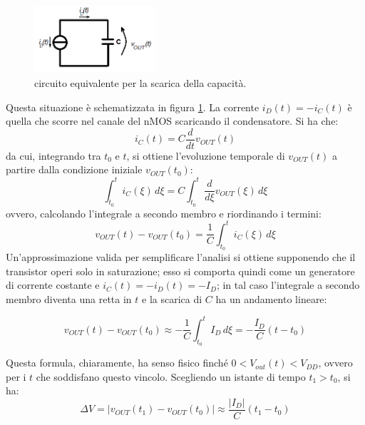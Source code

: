 \begin{figure}[hbt!]
	\centering
	\includegraphics[width=0.4\textwidth]{figure/Sch_scaricaC.png}
	\caption{circuito equivalente per la scarica della capacità.}
	\label{fig:fig_sch_scaricaC}
\end{figure}

Questa situazione è schematizzata in figura \ref{fig:fig_sch_scaricaC}. La corrente $i_D(t) = - i_C(t)$ è quella che scorre nel canale del nMOS scaricando il condensatore. Si ha che:
\begin{equation}
i_C(t) = C \frac{d}{dt}v_{OUT}(t)
\label{eq:eq_condensatore}
\end{equation}
da cui, integrando tra $t_0$ e $t$, si ottiene l'evoluzione temporale di $v_{OUT}(t)$ a partire dalla condizione iniziale $v_{OUT}(t_0)$:
\begin{equation}
\int_{t_0}^{t} i_C(\xi)\, d\xi = C \int_{t_0}^{t} \frac{d}{d\xi}v_{OUT}(\xi)\, d\xi
\label{eq:eq_condensatoreIntegrata}
\end{equation}
ovvero, calcolando l'integrale a secondo membro e riordinando i termini:
\begin{equation}
v_{OUT}(t) - v_{OUT}(t_0) = \frac{1}{C}\int_{t_0}^{t} i_C(\xi)\, d\xi
\label{eq:eq_condensatoreSoluzione}
\end{equation}
Un'approssimazione valida per semplificare l'analisi si ottiene supponendo che il transistor operi solo in saturazione; esso si comporta quindi come un generatore di corrente costante e $i_C(t) = - i_D(t) = - I_D$; in tal caso l'integrale a secondo membro diventa una retta in $t$ e la scarica di $C$ ha un andamento lineare:

\begin{equation}
v_{OUT}(t) - v_{OUT}(t_0) \approx - \frac{1}{C}\int_{t_0}^{t} I_D \, d\xi = - \frac{I_D}{C}(t - t_0)
\label{eq:eq_condensatoreSoluzioneLineare}
\end{equation}

Questa formula, chiaramente, ha senso fisico finché $0 < V_{out}(t) < V_{DD}$, ovvero per i $t$ che soddisfano questo vincolo. Scegliendo un istante di tempo $t_1 > t_0$, si ha:
\begin{equation}
\Delta V = \left | v_{OUT}(t_1) - v_{OUT}(t_0) \right | \approx \frac{\left | I_D \right | }{C}(t_1 - t_0)
\label{eq:eq_condesatoreLineare}
\end{equation}


